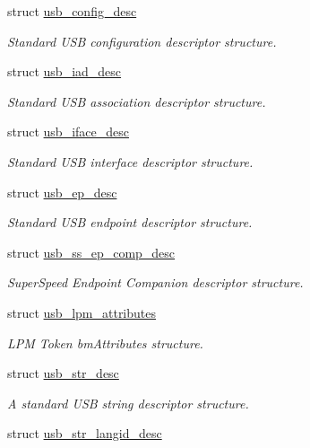 \begin{DoxyCompactItemize}
struct \hyperlink{structusb__config__desc}{usb\+\_\+config\+\_\+desc}
\begin{DoxyCompactList}\small\item\em Standard U\+SB configuration descriptor structure. \end{DoxyCompactList}\item 
struct \hyperlink{structusb__iad__desc}{usb\+\_\+iad\+\_\+desc}
\begin{DoxyCompactList}\small\item\em Standard U\+SB association descriptor structure. \end{DoxyCompactList}\item 
struct \hyperlink{structusb__iface__desc}{usb\+\_\+iface\+\_\+desc}
\begin{DoxyCompactList}\small\item\em Standard U\+SB interface descriptor structure. \end{DoxyCompactList}\item 
struct \hyperlink{structusb__ep__desc}{usb\+\_\+ep\+\_\+desc}
\begin{DoxyCompactList}\small\item\em Standard U\+SB endpoint descriptor structure. \end{DoxyCompactList}\item 
struct \hyperlink{structusb__ss__ep__comp__desc}{usb\+\_\+ss\+\_\+ep\+\_\+comp\+\_\+desc}
\begin{DoxyCompactList}\small\item\em Super\+Speed Endpoint Companion descriptor structure. \end{DoxyCompactList}\item 
struct \hyperlink{structusb__lpm__attributes}{usb\+\_\+lpm\+\_\+attributes}
\begin{DoxyCompactList}\small\item\em L\+PM Token bm\+Attributes structure. \end{DoxyCompactList}\item 
struct \hyperlink{structusb__str__desc}{usb\+\_\+str\+\_\+desc}
\begin{DoxyCompactList}\small\item\em A standard U\+SB string descriptor structure. \end{DoxyCompactList}\item 
struct \hyperlink{structusb__str__langid__desc}{usb\+\_\+str\+\_\+langid\+\_\+desc}
\end{DoxyCompactItemize}
